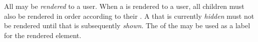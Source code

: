 All  may be \textit{rendered} to a user. When a  is rendered to a user, all children  must also be rendered in order according to their . A  that is currently \textit{hidden} must not be rendered until that  is subsequently \textit{shown}. The  of the  may be used as a label for the rendered element. 
